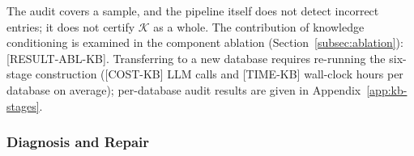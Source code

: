 \documentclass[letterpaper,journal]{IEEEtran}
\begin{document}

\begin{table}[!t]
\centering
\caption{Entry-level audit of the LLM-inferred knowledge base. Values marked with $[\cdot]$ are placeholders to be replaced by the measured results.}
\label{tab:kb-audit}
\small
\setlength{\tabcolsep}{3pt}
\renewcommand{\arraystretch}{1.15}
\end{table}

The audit covers a sample, and the pipeline itself does not detect incorrect entries; it does not certify $\mathcal{K}$ as a whole. The contribution of knowledge conditioning is examined in the component ablation (Section~\ref{subsec:ablation}): [RESULT-ABL-KB]. Transferring to a new database requires re-running the six-stage construction ([COST-KB] LLM calls and [TIME-KB] wall-clock hours per database on average); per-database audit results are given in Appendix~\ref{app:kb-stages}.



\subsubsection{Diagnosis and Repair}
\label{subsec:diagnosis-evaluation}\label{subsec:paired-refinement}
\end{document}
